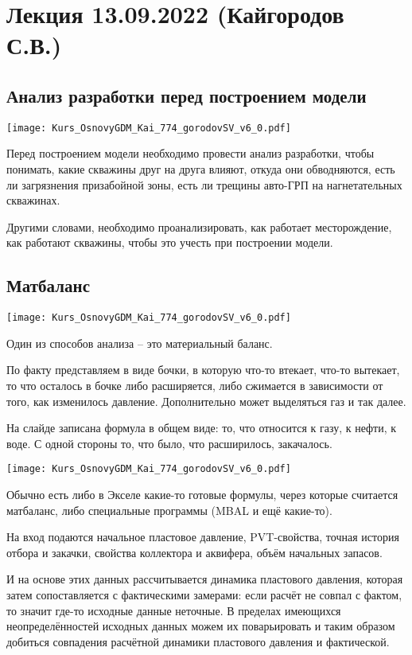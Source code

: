 \documentclass[main.tex]{subfiles}
\begin{document}
\section{Лекция 13.09.2022 (Кайгородов С.В.)}

\subsection{Анализ разработки перед построением модели}

\texttt{[image: Kurs\_OsnovyGDM\_Kai\_774\_gorodovSV\_v6\_0.pdf]}

Перед построением модели необходимо провести анализ разработки, чтобы понимать, какие скважины друг на друга влияют, откуда они обводняются, есть ли загрязнения призабойной зоны, есть ли трещины авто-ГРП на нагнетательных скважинах.

Другими словами, необходимо проанализировать, как работает месторождение, как работают скважины, чтобы это учесть при построении модели.

\subsection{Матбаланс}

\texttt{[image: Kurs\_OsnovyGDM\_Kai\_774\_gorodovSV\_v6\_0.pdf]}

Один из способов анализа -- это материальный баланс.

По факту представляем в виде бочки, в которую что-то втекает, что-то вытекает, то что осталось в бочке либо расширяется, либо сжимается в зависимости от того, как изменилось давление.
Дополнительно может выделяться газ и так далее.

На слайде записана формула в общем виде: то, что относится к газу, к нефти, к воде.
С одной стороны то, что было, что расширилось, закачалось.

\texttt{[image: Kurs\_OsnovyGDM\_Kai\_774\_gorodovSV\_v6\_0.pdf]}

Обычно есть либо в Экселе какие-то готовые формулы, через которые считается матбаланс, либо специальные программы (MBAL и ещё какие-то).

На вход подаются начальное пластовое давление, PVT-свойства, точная история отбора и закачки, свойства коллектора и аквифера, объём начальных запасов.

И на основе этих данных рассчитывается динамика пластового давления, которая затем сопоставляется с фактическими замерами: если расчёт не совпал с фактом, то значит где-то исходные данные неточные.
В пределах имеющихся неопределённостей исходных данных можем их поварьировать и таким образом добиться совпадения расчётной динамики пластового давления и фактической.
\end{document}
